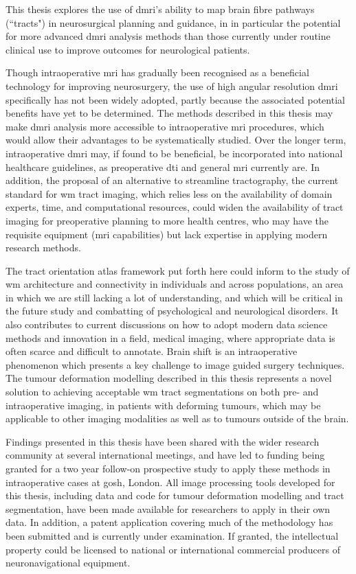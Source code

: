 \begin{impactstatement}

This thesis explores the use of \gls{dmri}'s ability to map brain fibre pathways (``tracts") in neurosurgical planning and guidance, in in particular the potential for more advanced \gls{dmri} analysis methods than those currently under routine clinical use to improve outcomes for neurological patients.

Though intraoperative \gls{mri} has gradually been recognised as a beneficial technology for improving neurosurgery, the use of high angular resolution \gls{dmri} specifically has not been widely adopted, partly because the associated potential benefits have yet to be determined.
The methods described in this thesis may make \gls{dmri} analysis more accessible to intraoperative \gls{mri} procedures, which would allow their advantages to be systematically studied.
Over the longer term, intraoperative \gls{dmri} may, if found to be beneficial, be incorporated into national healthcare guidelines, as preoperative \gls{dti} and general \gls{mri} currently are.
In addition, the proposal of an alternative to streamline tractography, the current standard for \gls{wm} tract imaging, which relies less on the availability of domain experts, time, and computational resources, could widen the availability of tract imaging for preoperative planning to more health centres, who may have the requisite equipment (\gls{mri} capabilities) but lack expertise in applying modern research methods.

The tract orientation atlas framework put forth here could inform to the study of \gls{wm} architecture and connectivity in individuals and across populations, an area in which we are still lacking a lot of understanding, and which will be critical in the future study and combatting of psychological and neurological disorders.
It also contributes to current discussions on how to adopt modern data science methods and innovation in a field, medical imaging, where appropriate data is often scarce and difficult to annotate.
Brain shift is an intraoperative phenomenon which presents a key challenge to image guided surgery techniques.
The tumour deformation modelling described in this thesis represents a novel solution to achieving acceptable \gls{wm} tract segmentations on both pre- and intraoperative imaging, in patients with deforming tumours, which may be applicable to other imaging modalities as well as to tumours outside of the brain.

Findings presented in this thesis have been shared with the wider research community at several international meetings, and have led to funding being granted for a two year follow-on prospective study to apply these methods in intraoperative cases at \gls{gosh}, London.
All image processing tools developed for this thesis, including data and code for tumour deformation modelling and tract segmentation, have been made available for researchers to apply in their own data.
In addition, a patent application covering much of the methodology has been submitted and is currently under examination.
If granted, the intellectual property could be licensed to national or international commercial producers of neuronavigational equipment.


\end{impactstatement}
